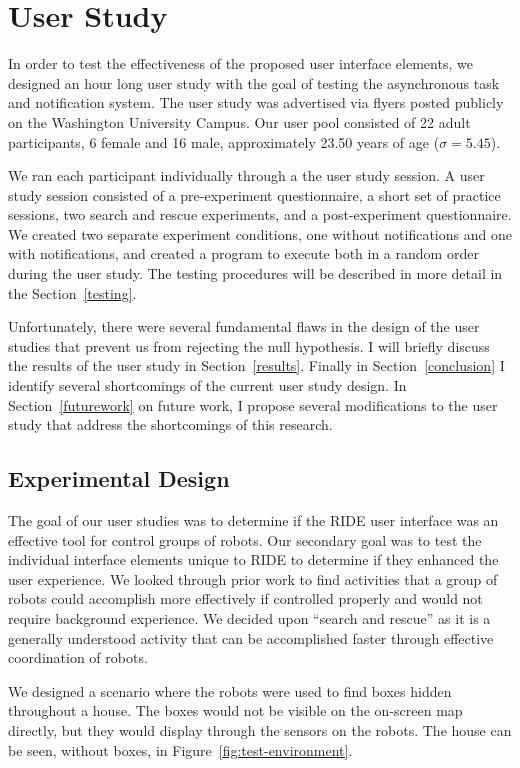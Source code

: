 \chapter{User Study}
In order to test the effectiveness of the proposed user interface elements, we designed an hour long user study with the goal of testing the asynchronous task and notification system. The user study was advertised via flyers posted publicly on the Washington University Campus. Our user pool consisted of 22 adult participants, 6 female and 16 male, approximately 23.50 years of age ($\sigma=5.45$).

We ran each participant individually through a the user study session. A user study session consisted of a pre-experiment questionnaire, a short set of practice sessions, two search and rescue experiments, and a post-experiment questionnaire. We created two separate experiment conditions, one without notifications and one with notifications, and created a program to execute both in a random order during the user study. The testing procedures will be described in more detail in the Section~\ref{testing}.

Unfortunately, there were several fundamental flaws in the design of the user studies that prevent us from rejecting the null hypothesis. I will briefly discuss the results of the user study in Section~\ref{results}. Finally in Section~\ref{conclusion} I identify several shortcomings of the current user study design. In Section~\ref{futurework} on future work, I propose several modifications to the user study that address the shortcomings of this research.

\section{Experimental Design}
The goal of our user studies was to determine if the RIDE user interface was an effective tool for control groups of robots. Our secondary goal was to test the individual interface elements unique to RIDE to determine if they enhanced the user experience. We looked through prior work to find activities that a group of robots could accomplish more effectively if controlled properly and would not require background experience. We decided upon ``search and rescue'' as it is a generally understood activity that can be accomplished faster through effective coordination of robots. 

We designed a scenario where the robots were used to find boxes hidden throughout a house. The boxes would not be visible on the on-screen map directly, but they would display through the sensors on the robots. The house can be seen, without boxes, in Figure~\ref{fig:test-environment}. 

